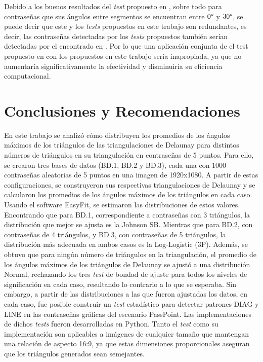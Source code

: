 \documentclass[12pt]{report}
\begin{document}
Debido a los buenos resultados del \textit{test} propuesto en \cite{13}, sobre todo para contraseñas que sus ángulos entre segmentos se encuentran entre $0\degree$ y $30\degree$, se puede decir que este y los \textit{tests} propuestos en este trabajo son redundantes, es decir, las contraseñas detectadas por los\textit{ tests} propuestos también serían detectadas por el encontrado en \cite{13}. Por lo que una aplicación conjunta de el test propuesto en \cite{13} con los propuestos en este trabajo sería inapropiada, ya que no aumentaría significativamente la efectividad y disminuiría su eficiencia computacional.

\chapter*{Conclusiones y Recomendaciones }
En este trabajo se analizó cómo distribuyen los promedios de los ángulos máximos de los triángulos de las triangulaciones de Delaunay para distintos números de triángulos en su triangulación en contraseñas de 5 puntos. Para ello, se crearon tres bases de datos (BD.1, BD.2 y BD.3), cada una con 1000 contraseñas aleatorias de 5 puntos en una imagen de 1920x1080. A partir de estas configuraciones, se construyeron sus respectivas triangulaciones de Delaunay y se calcularon los promedios de los ángulos máximos de los triángulos en cada caso. Usando el software EasyFit, se estimaron las distribuciones de estos valores. Encontrando que para BD.1, correspondiente a contraseñas con 3 triángulos, la distribución que mejor se ajusta es la Johnson SB. Mientras que para BD.2, con contraseñas de 4 triángulos, y BD.3, con contraseñas de 5 triángulos, la distribución más adecuada en ambos casos es la Log-Logistic (3P). Además, se obtuvo que para ningún número de  triángulos en la triangulación, el promedio de los ángulos máximos de los triángulos de Delaunay  se ajustó a una distribución Normal, rechazando los tres \textit{test} de bondad de ajuste para todos los niveles de significación en cada caso, resultando lo contrario a lo que se esperaba. Sin embargo, a partir de las distribuciones a las que fueron ajustadas los datos, en cada caso, fue posible construir un \textit{test} estadístico para detectar patrones DIAG y LINE en las contraseñas gráficas del escenario PassPoint. Las implementaciones de dichos \textit{tests} fueron desarrolladas en Python. Tanto el \textit{test} como su implementación son aplicables a imágenes de cualquier tamaño que mantengan una relación de aspecto 16:9, ya que estas dimensiones proporcionales aseguran que los triángulos generados sean semejantes. 
\end{document}
